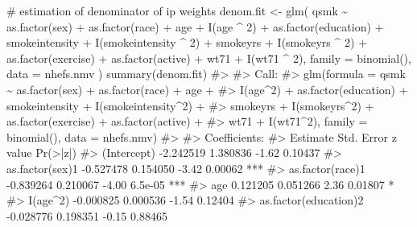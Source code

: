 \documentclass[
  10pt,
  a4paper,
]{book}
\newenvironment{Shaded}{\begin{snugshade}}{\end{snugshade}}
\newcommand{\AttributeTok}[1]{\textcolor[rgb]{0.40,0.45,0.13}{#1}}
\newcommand{\CommentTok}[1]{\textcolor[rgb]{0.37,0.37,0.37}{#1}}
\newcommand{\DecValTok}[1]{\textcolor[rgb]{0.68,0.00,0.00}{#1}}
\newcommand{\FunctionTok}[1]{\textcolor[rgb]{0.28,0.35,0.67}{#1}}
\newcommand{\NormalTok}[1]{\textcolor[rgb]{0.00,0.46,0.62}{#1}}
\newcommand{\OtherTok}[1]{\textcolor[rgb]{0.00,0.46,0.62}{#1}}
\newcommand{\SpecialCharTok}[1]{\textcolor[rgb]{0.37,0.37,0.37}{#1}}
\begin{document}
\begin{Shaded}
\begin{Highlighting}[]
\CommentTok{\# estimation of denominator of ip weights}
\NormalTok{denom.fit }\OtherTok{\textless{}{-}}
  \FunctionTok{glm}\NormalTok{(}
\NormalTok{    qsmk }\SpecialCharTok{\textasciitilde{}} \FunctionTok{as.factor}\NormalTok{(sex) }\SpecialCharTok{+} \FunctionTok{as.factor}\NormalTok{(race) }\SpecialCharTok{+}\NormalTok{ age }\SpecialCharTok{+} \FunctionTok{I}\NormalTok{(age }\SpecialCharTok{\^{}} \DecValTok{2}\NormalTok{) }\SpecialCharTok{+}
      \FunctionTok{as.factor}\NormalTok{(education) }\SpecialCharTok{+}\NormalTok{ smokeintensity }\SpecialCharTok{+}
      \FunctionTok{I}\NormalTok{(smokeintensity }\SpecialCharTok{\^{}} \DecValTok{2}\NormalTok{) }\SpecialCharTok{+}\NormalTok{ smokeyrs }\SpecialCharTok{+} \FunctionTok{I}\NormalTok{(smokeyrs }\SpecialCharTok{\^{}} \DecValTok{2}\NormalTok{) }\SpecialCharTok{+}
      \FunctionTok{as.factor}\NormalTok{(exercise) }\SpecialCharTok{+} \FunctionTok{as.factor}\NormalTok{(active) }\SpecialCharTok{+}\NormalTok{ wt71 }\SpecialCharTok{+} \FunctionTok{I}\NormalTok{(wt71 }\SpecialCharTok{\^{}} \DecValTok{2}\NormalTok{),}
    \AttributeTok{family =} \FunctionTok{binomial}\NormalTok{(),}
    \AttributeTok{data =}\NormalTok{ nhefs.nmv}
\NormalTok{  )}
\FunctionTok{summary}\NormalTok{(denom.fit)}
\CommentTok{\#\textgreater{} }
\CommentTok{\#\textgreater{} Call:}
\CommentTok{\#\textgreater{} glm(formula = qsmk \textasciitilde{} as.factor(sex) + as.factor(race) + age + }
\CommentTok{\#\textgreater{}     I(age\^{}2) + as.factor(education) + smokeintensity + I(smokeintensity\^{}2) + }
\CommentTok{\#\textgreater{}     smokeyrs + I(smokeyrs\^{}2) + as.factor(exercise) + as.factor(active) + }
\CommentTok{\#\textgreater{}     wt71 + I(wt71\^{}2), family = binomial(), data = nhefs.nmv)}
\CommentTok{\#\textgreater{} }
\CommentTok{\#\textgreater{} Coefficients:}
\CommentTok{\#\textgreater{}                        Estimate Std. Error z value Pr(\textgreater{}|z|)    }
\CommentTok{\#\textgreater{} (Intercept)           {-}2.242519   1.380836   {-}1.62  0.10437    }
\CommentTok{\#\textgreater{} as.factor(sex)1       {-}0.527478   0.154050   {-}3.42  0.00062 ***}
\CommentTok{\#\textgreater{} as.factor(race)1      {-}0.839264   0.210067   {-}4.00  6.5e{-}05 ***}
\CommentTok{\#\textgreater{} age                    0.121205   0.051266    2.36  0.01807 *  }
\CommentTok{\#\textgreater{} I(age\^{}2)              {-}0.000825   0.000536   {-}1.54  0.12404    }
\CommentTok{\#\textgreater{} as.factor(education)2 {-}0.028776   0.198351   {-}0.15  0.88465    }

\end{Highlighting}
\end{Shaded}
\end{document}

